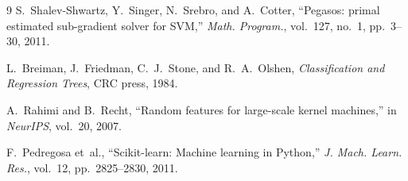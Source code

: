 \documentclass[10pt,twocolumn,a4paper]{article}
\begin{document}
  \begin{thebibliography}{9}
  \setlength{\itemsep}{1pt plus 0.5pt}
  \setlength{\parskip}{0pt}
  S.~Shalev-Shwartz, Y.~Singer, N.~Srebro, and A.~Cotter,
  ``Pegasos: primal estimated sub-gradient solver for SVM,''
  \emph{Math. Program.}, vol.~127, no.~1, pp.~3--30, 2011.

  L.~Breiman, J.~Friedman, C.~J.~Stone, and R.~A.~Olshen,
  \emph{Classification and Regression Trees}, CRC press, 1984.

  A.~Rahimi and B.~Recht,
  ``Random features for large-scale kernel machines,''
  in \emph{NeurIPS}, vol.~20, 2007.

  F.~Pedregosa et~al.,
  ``Scikit-learn: Machine learning in Python,''
  \emph{J. Mach. Learn. Res.}, vol.~12, pp.~2825--2830, 2011.
  \end{thebibliography}

  
\end{document}
